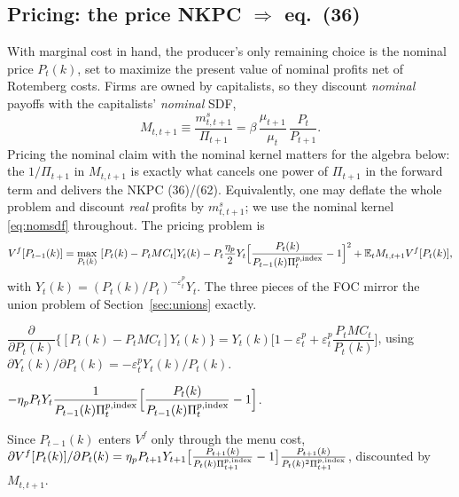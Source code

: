 \subsection{Pricing: the price NKPC \texorpdfstring{$\Rightarrow$}{=>} eq.\ (36)}
With marginal cost in hand, the producer's only remaining choice is the nominal price $P_t(k)$, set to
maximize the present value of nominal profits net of Rotemberg costs. Firms are owned by capitalists,
so they discount \emph{nominal} payoffs with the capitalists' \emph{nominal} SDF,
\begin{equation}\label{eq:nomsdf}
M_{t,t+1}\equiv\frac{m^s_{t,t+1}}{\Pi_{t+1}}
=\beta\,\frac{\mu_{t+1}}{\mu_t}\,\frac{P_t}{P_{t+1}} .
\end{equation}
Pricing the nominal claim with the nominal kernel matters for the algebra below: the $1/\Pi_{t+1}$ in
$M_{t,t+1}$ is exactly what cancels one power of $\Pi_{t+1}$ in the forward term and delivers the
NKPC (36)/(62). Equivalently, one may deflate the whole problem and discount \emph{real} profits by
$m^s_{t,t+1}$; we use the nominal kernel \eqref{eq:nomsdf} throughout.
The pricing problem is
\[
V^f[P_{t-1}(k)]=\max_{P_t(k)}\ [P_t(k)-P_tMC_t]Y_t(k)
-P_t\frac{\eta_p}{2}Y_t\Big[\frac{P_t(k)}{P_{t-1}(k)\Pi^{p,\Ind}_t}-1\Big]^2
+\E_t M_{t,t+1}V^f[P_t(k)],
\]
with $Y_t(k)=(P_t(k)/P_t)^{-\varepsilon^p_t}Y_t$. The three pieces of the FOC mirror the union
problem of Section~\ref{sec:unions} exactly.

$\dfrac{\partial}{\partial P_t(k)}\big\{[P_t(k)-P_tMC_t]Y_t(k)\big\}
=Y_t(k)\Big[1-\varepsilon^p_t+\varepsilon^p_t\dfrac{P_tMC_t}{P_t(k)}\Big]$, using
$\partial Y_t(k)/\partial P_t(k)=-\varepsilon^p_tY_t(k)/P_t(k)$.

$-\eta_pP_tY_t\dfrac{1}{P_{t-1}(k)\Pi^{p,\text{index}}_t}\Big[\dfrac{P_t(k)}{P_{t-1}(k)\Pi^{p,\text{index}}_t}-1\Big]$.

Since $P_{t-1}(k)$ enters $V^f$ only through the menu cost,
$\partial V^f[P_t(k)]/\partial P_t(k)
=\eta_pP_{t+1}Y_{t+1}\big[\tfrac{P_{t+1}(k)}{P_t(k)\Pi^{p,\text{index}}_{t+1}}-1\big]
\tfrac{P_{t+1}(k)}{P_t(k)^2\Pi^{p,\text{index}}_{t+1}}$, discounted by $M_{t,t+1}$.

